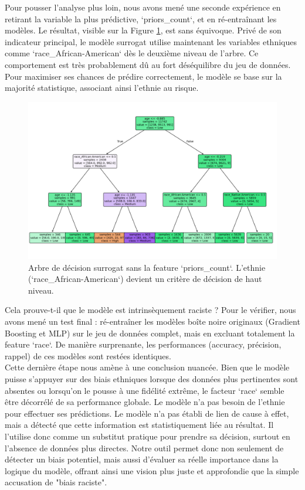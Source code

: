 \documentclass{article}
\begin{document}
Pour pousser l'analyse plus loin, nous avons mené une seconde expérience en retirant la variable la plus prédictive, `priors\_count`, et en ré-entraînant les modèles. Le résultat, visible sur la Figure \ref{fig:tree_without_prior}, est sans équivoque. Privé de son indicateur principal, le modèle surrogat utilise maintenant les variables ethniques comme `race\_African-American` dès le deuxième niveau de l'arbre. Ce comportement est très probablement dû au fort déséquilibre du jeu de données. Pour maximiser ses chances de prédire correctement, le modèle se base sur la majorité statistique, associant ainsi l'ethnie au risque.

\begin{figure}[h!]
    \centering
    \includegraphics[width=\textwidth]{tree_withoutprior.png}
    \caption{Arbre de décision surrogat sans la feature `priors\_count`. L'ethnie (`race\_African-American`) devient un critère de décision de haut niveau.}
    \label{fig:tree_without_prior}
\end{figure}

\quad Cela prouve-t-il que le modèle est intrinsèquement raciste ? Pour le vérifier, nous avons mené un test final : ré-entraîner les modèles boîte noire originaux (Gradient Boosting et MLP) sur le jeu de données complet, mais en excluant totalement la feature `race`. De manière surprenante, les performances (accuracy, précision, rappel) de ces modèles sont restées identiques.\\

Cette dernière étape nous amène à une conclusion nuancée. Bien que le modèle puisse s'appuyer sur des biais ethniques lorsque des données plus pertinentes sont absentes ou lorsqu'on le pousse à une fidélité extrême, le facteur `race` semble être décorrélé de sa performance globale. Le modèle n'a pas besoin de l'ethnie pour effectuer ses prédictions. Le modèle n'a pas établi de lien de cause à effet, mais a détecté que cette information est statistiquement liée au résultat. Il l'utilise donc comme un substitut pratique pour prendre sa décision, surtout en l'absence de données plus directes. Notre outil permet donc non seulement de détecter un biais potentiel, mais aussi d'évaluer sa réelle importance dans la logique du modèle, offrant ainsi une vision plus juste et approfondie que la simple accusation de "biais raciste".
\end{document}
